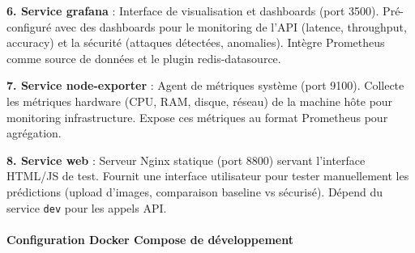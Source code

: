 \textbf{6. Service grafana} : Interface de visualisation et dashboards (port 3500). Pré-configuré avec des dashboards pour le monitoring de l'API (latence, throughput, accuracy) et la sécurité (attaques détectées, anomalies). Intègre Prometheus comme source de données et le plugin redis-datasource.

\textbf{7. Service node-exporter} : Agent de métriques système (port 9100). Collecte les métriques hardware (CPU, RAM, disque, réseau) de la machine hôte pour monitoring infrastructure. Expose ces métriques au format Prometheus pour agrégation.

\textbf{8. Service web} : Serveur Nginx statique (port 8800) servant l'interface HTML/JS de test. Fournit une interface utilisateur pour tester manuellement les prédictions (upload d'images, comparaison baseline vs sécurisé). Dépend du service \texttt{dev} pour les appels API.

\paragraph{Configuration Docker Compose de développement}

